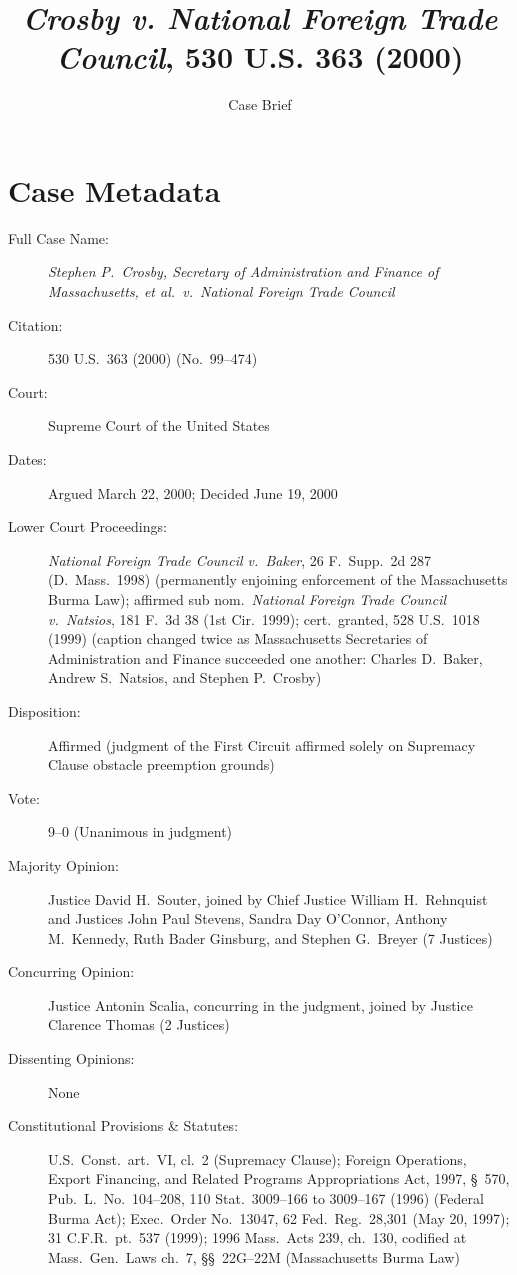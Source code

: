 \documentclass[12pt]{article}
\title{\textit{Crosby v. National Foreign Trade Council}, 530 U.S. 363 (2000)}
\author{Case Brief}
\date{}
\begin{document}
\maketitle


\section{Case Metadata}

\begin{description}
    \item[Full Case Name:] \textit{Stephen P.\ Crosby, Secretary of Administration and Finance of Massachusetts, et al.\ v.\ National Foreign Trade Council}
    \item[Citation:] 530 U.S.\ 363 (2000) (No.\ 99--474)
    \item[Court:] Supreme Court of the United States
    \item[Dates:] Argued March 22, 2000; Decided June 19, 2000
    \item[Lower Court Proceedings:] \textit{National Foreign Trade Council v.\ Baker}, 26 F.\ Supp.\ 2d 287 (D.\ Mass.\ 1998) (permanently enjoining enforcement of the Massachusetts Burma Law); affirmed sub nom.\ \textit{National Foreign Trade Council v.\ Natsios}, 181 F.\ 3d 38 (1st Cir.\ 1999); cert.\ granted, 528 U.S.\ 1018 (1999) (caption changed twice as Massachusetts Secretaries of Administration and Finance succeeded one another: Charles D.\ Baker, Andrew S.\ Natsios, and Stephen P.\ Crosby)
    \item[Disposition:] Affirmed (judgment of the First Circuit affirmed solely on Supremacy Clause obstacle preemption grounds)
    \item[Vote:] 9--0 (Unanimous in judgment)
    \item[Majority Opinion:] Justice David H.\ Souter, joined by Chief Justice William H.\ Rehnquist and Justices John Paul Stevens, Sandra Day O'Connor, Anthony M.\ Kennedy, Ruth Bader Ginsburg, and Stephen G.\ Breyer (7 Justices)
    \item[Concurring Opinion:] Justice Antonin Scalia, concurring in the judgment, joined by Justice Clarence Thomas (2 Justices)
    \item[Dissenting Opinions:] None
    \item[Constitutional Provisions \& Statutes:] U.S.\ Const.\ art.\ VI, cl.\ 2 (Supremacy Clause); Foreign Operations, Export Financing, and Related Programs Appropriations Act, 1997, \S~570, Pub.\ L.\ No.\ 104--208, 110 Stat.\ 3009--166 to 3009--167 (1996) (Federal Burma Act); Exec.\ Order No.\ 13047, 62 Fed.\ Reg.\ 28,301 (May 20, 1997); 31 C.F.R.\ pt.\ 537 (1999); 1996 Mass.\ Acts 239, ch.\ 130, codified at Mass.\ Gen.\ Laws ch.\ 7, \S\S~22G--22M (Massachusetts Burma Law)

\end{description}
\end{document}
